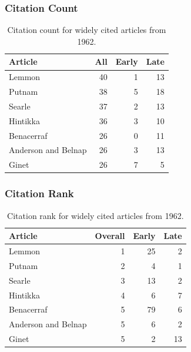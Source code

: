 \documentclass[
  10pt,
  letterpaper,
  DIV=11,
  numbers=noendperiod,
  twoside]{scrartcl}
\begin{document}
\subsubsection*{Citation Count}\label{sec-count-1962}

\begin{longtable}[]{@{}lrrr@{}}

\caption{\label{tbl-citation-count-1962}Citation count for widely cited
articles from 1962.}

\tabularnewline

\toprule\noalign{}
Article & All & Early & Late \\
\midrule\noalign{}
\endhead
\bottomrule\noalign{}
\endlastfoot
Lemmon & 40 & 1 & 13 \\
Putnam & 38 & 5 & 18 \\
Searle & 37 & 2 & 13 \\
Hintikka & 36 & 3 & 10 \\
Benacerraf & 26 & 0 & 11 \\
Anderson and Belnap & 26 & 3 & 13 \\
Ginet & 26 & 7 & 5 \\

\end{longtable}

\subsubsection*{Citation Rank}\label{sec-rank-1962}

\begin{longtable}[]{@{}lrrr@{}}

\caption{\label{tbl-citation-rank-1962}Citation rank for widely cited
articles from 1962.}

\tabularnewline

\toprule\noalign{}
Article & Overall & Early & Late \\
\midrule\noalign{}
\endhead
\bottomrule\noalign{}
\endlastfoot
Lemmon & 1 & 25 & 2 \\
Putnam & 2 & 4 & 1 \\
Searle & 3 & 13 & 2 \\
Hintikka & 4 & 6 & 7 \\
Benacerraf & 5 & 79 & 6 \\
Anderson and Belnap & 5 & 6 & 2 \\
Ginet & 5 & 2 & 13 \\

\end{longtable}
\end{document}
